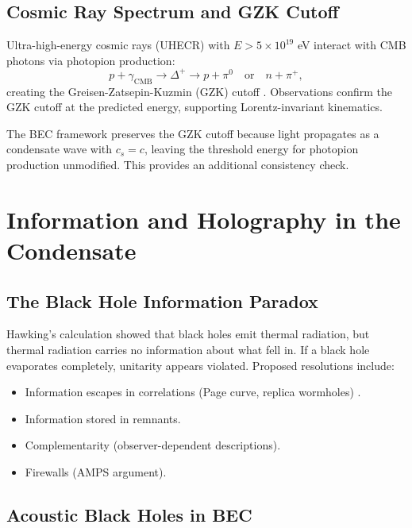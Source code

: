 \documentclass[11pt,a4paper]{article}
\newcommand{\cs}{\ensuremath{c_s}}
\theoremstyle{definition}
\theoremstyle{remark}
\begin{document}
\subsection{Cosmic Ray Spectrum and GZK Cutoff}
\label{sec:grb_cutoff}

Ultra-high-energy cosmic rays (UHECR) with $E > 5 \times 10^{19}$ eV interact with CMB photons via photopion production:
\begin{equation}
p + \gamma_{\mathrm{CMB}} \to \Delta^+ \to p + \pi^0 \quad \text{or} \quad n + \pi^+,
\end{equation}
creating the Greisen-Zatsepin-Kuzmin (GZK) cutoff \cite{Greisen1966,Pierre2008}. Observations confirm the GZK cutoff at the predicted energy, supporting Lorentz-invariant kinematics.

The BEC framework preserves the GZK cutoff because light propagates as a condensate wave with $\cs = c$, leaving the threshold energy for photopion production unmodified. This provides an additional consistency check.

\section{Information and Holography in the Condensate}
\label{sec:information_holography}

\subsection{The Black Hole Information Paradox}
\label{sec:info_paradox}

Hawking's calculation \cite{Hawking1976} showed that black holes emit thermal radiation, but thermal radiation carries no information about what fell in. If a black hole evaporates completely, unitarity appears violated. Proposed resolutions include:
\begin{itemize}
\item Information escapes in correlations (Page curve, replica wormholes) \cite{Page1993,Almheiri2021}.
\item Information stored in remnants.
\item Complementarity (observer-dependent descriptions).
\item Firewalls (AMPS argument).
\end{itemize}

\subsection{Acoustic Black Holes in BEC}
\label{sec:acoustic_bh}
\end{document}
